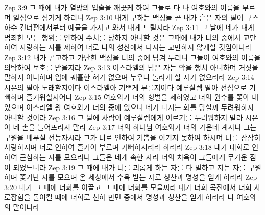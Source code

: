 Zep 3:9  그 때에 내가 열방의 입술을 깨끗케 하여 그들로 다 나 여호와의 이름을 부르며 일심으로 섬기게 하리니
Zep 3:10  내게 구하는 백성들 곧 내가 흩은 자의 딸이 구스 하수 건너편에서부터 예물을 가지고 와서 내게 드릴지라
Zep 3:11  그 날에 네가 내게 범죄한 모든 행위를 인하여 수치를 당하지 아니할 것은 그때에 내가 너의 중에서 교만하여 자랑하는 자를 제하여 너로 나의 성산에서 다시는 교만하지 않게할 것임이니라
Zep 3:12  내가 곤고하고 가난한 백성을 너의 중에 남겨 두리니 그들이 여호와의 이름을 의탁하여 보호를 받을지라
Zep 3:13  이스라엘의 남은 자는 악을 행치 아니하며 거짓을 말하지 아니하며 입에 궤휼한 혀가 없으며 누우나 놀라게 할 자가 없으리라
Zep 3:14  시온의 딸아 노래할지어다 이스라엘아 기쁘게 부를지어다 예루살렘 딸아 전심으로 기뻐하며 즐거워할지어다
Zep 3:15  여호와가 너의 형벌을 제하였고 너의 원수를 쫓아 내었으며 이스라엘 왕 여호와가 너의 중에 있으니 네가 다시는 화를 당할까 두려워하지 아니할 것이라
Zep 3:16  그 날에 사람이 예루살렘에게 이르기를 두려워하지 말라 시온아 네 손을 늘어뜨리지 말라
Zep 3:17  너의 하나님 여호와가 너의 가운데 계시니 그는 구원을 베푸실 전능자시라 그가 너로 인하여 기쁨을 이기지 못하여 하시며 너를 잠잠히 사랑하시며 너로 인하여 즐거이 부르며 기뻐하시리라 하리라
Zep 3:18  내가 대회로 인하여 근심하는 자를 모으리니 그들은 네게 속한 자라 너의 치욕이 그들에게 무거운 짐이 되었느니라
Zep 3:19  그 때에 내가 너를 괴롭게 하는 자를 다 벌하고 저는 자를 구원하며 쫓겨난 자를 모으며 온 세상에서 수욕 받는 자로 칭찬과 명성을 얻게 하리라
Zep 3:20  내가 그 때에 너희를 이끌고 그 때에 너희를 모을찌라 내가 너희 목전에서 너희 사로잡힘을 돌이킬 때에 너희로 천하 만민 중에서 명성과 칭찬을 얻게 하리라 나 여호와의 말이니라


